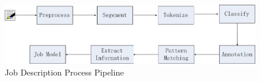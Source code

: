 \begin{figure}[htbp]
  \centering
  \includegraphics[scale=0.4]{images/pipeline.png}
  \caption{Job Description Process Pipeline}
  \label{fig:Pipeline}
\end{figure}
